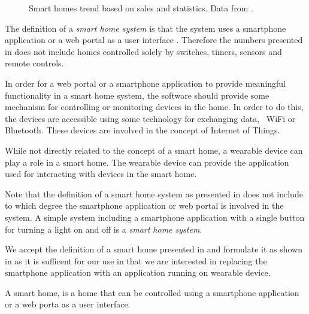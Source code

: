 \begin{figure}[!hbt]
  \centering
  
  \caption{Smart homes trend based on sales and statistics. Data from \protect\cite{SMARTHOMETREND}.}
  \label{fig:smarthomestrend}
\end{figure}

The definition of a \emph{smart home system} is  that the system uses a smartphone application or a web portal as a user interface \cite{SMARTHOMETREND}. Therefore the numbers presented in  does not include homes controlled solely by switches, timers, sensors and remote controls.

In order for a web portal or a smartphone application to provide meaningful functionality in a smart home system, the software should provide some mechanism for controlling or monitoring devices in the home. In order to do this, the devices are accessible using some technology for exchanging data, \eg~WiFi or Bluetooth. These devices are involved in the concept of Internet of Things. 

While not directly related to the concept of a smart home, a wearable device can play a role in a smart home. The wearable device can provide the application used for interacting with devices in the smart home.

Note that the definition of a smart home system as presented in \cite{SMARTHOMETREND} does not include to which degree the smartphone application or web portal is involved in the system. A simple system including a smartphone application with a single button for turning a light on and off is a \emph{smart home system}.

We accept the definition of a smart home presented in \cite{SMARTHOMETREND} and formulate it as shown in  as it is sufficent for our use in that we are interested in replacing the smartphone application with an application running on wearable device.

\begin{definition}
\label{def:smarthome}
A smart home, is a home that can be controlled using a smartphone application or a web porta as a user interface.
\end{definition}


